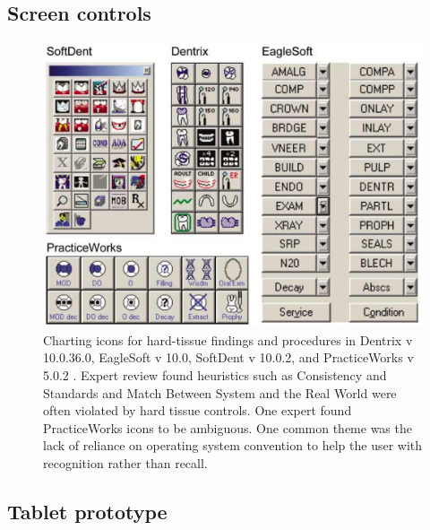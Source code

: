 \documentclass[11pt]{article}
\begin{document}
\subsection{Screen controls}
\label{controls}
\begin{figure}[h]
\begin{center}
\includegraphics[width=\textwidth]{controls.png}
\end{center}
\caption{Charting icons for hard-tissue findings and procedures in Dentrix v 10.0.36.0, EagleSoft v 10.0, SoftDent v 10.0.2, and PracticeWorks v 5.0.2 \cite{Thyvalikakath2007Heuristic-evalu}. Expert review found heuristics such as Consistency and Standards and Match Between System and the Real World were often violated by hard tissue controls. One expert found PracticeWorks icons to be ambiguous. One common theme was the lack of reliance on operating system convention to help the user with recognition rather than recall.}\end{figure}


\newpage
\subsection{Tablet prototype}
\label{Prototype}
\end{document}
